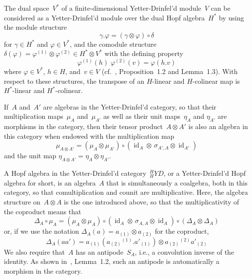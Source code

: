 \documentclass{article}
\newcounter{num}
\newenvironment{parlist}{\begin{list}{(\arabic{num})}{\usecounter{num} \leftmargin0pt \itemindent5pt \topsep0pt \labelwidth0pt}}{\end{list}}
\newcounter{num1}
\numberwithin{equation}{section}
\theoremstyle{definition}
\theoremstyle{break}
\newcommand{\id}{\operatorname{id}}
\newcommand{\ot}{\mathbin{\otimes}}
\newcommand{\1}{{(1)}}
\newcommand{\2}{{(2)}}
\newcommand{\3}{{(3)}}
\begin{document}
\begin{parlist}
\item
The dual space~$V^*$ of a finite-dimensional Yetter-Drinfel'd module~$V$ can be considered as a Yetter-Drinfel'd module over the dual Hopf algebra~$H^*$ by using the module structure
\begin{equation}
\gamma.\varphi = \left( \gamma \ot \varphi \right) \circ \delta  \label{dualaction}
\end{equation}
for $\gamma \in H^*$ and $\varphi \in V^*$, and the comodule structure 
$\delta(\varphi) = \varphi^{\1} \ot \varphi^{\2} \in H^* \ot V^*$ with the defining property 
\begin{equation}
\varphi^{\1}(h) \; \varphi^{\2}(v) = \varphi(h.v) \label{dualcoaction}
\end{equation}
where $\varphi \in V^*$, $h \in H$, and~$v \in V$ (cf.~\cite{SoYp}, Proposition~1.2 and Lemma~1.3). With respect to these structures, the transpose of an $H$-linear and $H$-colinear map is $H^*$-linear and $H^*$-colinear.

\item
If~$A$ and~$A'$ are algebras in the Yetter-Drinfel'd category, so that their multiplication maps~$\mu_{A}$ and~$\mu_{A'}$ as well as their unit maps~$\eta_{A}$ and $\eta_{A'}$ are morphisms in the category, then their tensor product~$A \ot A'$ is also an algebra in this category when endowed with the multiplication map
\[\mu_{A \ot A'} = \left( \mu_{A} \ot \mu_{A'} \right) \circ \left(\id_{A} \ot \, \sigma_{A',A} \ot \id_{A'} \right)\]
and the unit map $\eta_{A \ot A'} = \eta_{A} \ot \eta_{A'}$.

\item
A Hopf algebra in the Yetter-Drinfel'd category~$_{H}^{H}YD$, or a Yetter-Drinfel'd Hopf algebra for short, is an algebra~$A$ that is simultaneously a coalgebra, both in this category, so that comultiplication and counit are multiplicative. Here, the algebra structure on~$A \ot A$ is the one introduced above, so that the multiplicativity of the coproduct means that
\[\Delta_{A} \circ \mu_{A} =
\left( \mu_{A} \ot \mu_{A}\right) \circ \left(\id_{A} \ot \, \sigma_{A,A} \ot \id_{A} \right) \circ
\left( \Delta _{A} \ot \Delta _{A} \right)\]
or, if we use the notation $\Delta _{A}\left( a \right) = a_{\1} \ot a_{\2}$ for the coproduct,
\[\Delta _{A}\left( a a' \right) =
a_{\1} \left( a_{\2}{}^{\1}.a'_{\1}\right) \ot a_{\2}{}^{\2} a'_{\2}\]
We also require that~$A$ has an antipode~$S_{A}$, i.e., a convolution inverse of the identity. As shown in~\cite{KaSo2}, Lemma~1.2, such an antipode is automatically a morphism in the category.
\end{parlist}
\end{document}
